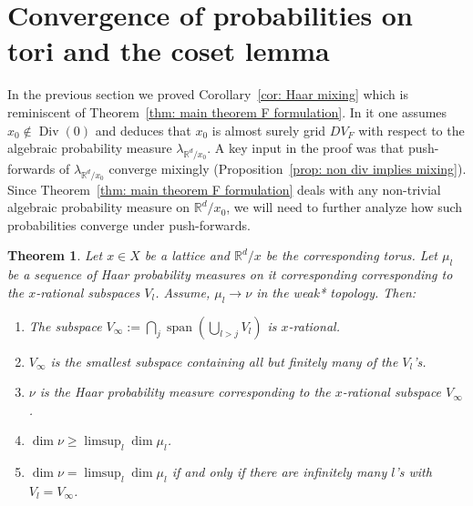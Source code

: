 \documentclass[reqno,11pt, twoside]{amsart}
\theoremstyle{plain}
\newtheorem{thm}{Theorem}[section]
\theoremstyle{definition}
\theoremstyle{definition}
\theoremstyle{remark}
\numberwithin{equation}{section}
\newcommand{\lam}{\lambda}
\newcommand{\bR}{\mathbb{R}}
\newcommand\pa[1]{\left(#1\right)}
\newcommand\on[1]{\operatorname{#1}}
\begin{document}
\section{Convergence of probabilities on tori and the coset lemma}\label{sec: coset}

In the previous section we proved Corollary~\ref{cor: Haar mixing} which is reminiscent of Theorem~\ref{thm: main theorem F formulation}. In it one assumes $x_0\notin \on{Div}(0)$ and deduces that $x_0$ is almost surely grid $DV_F$ with respect to the algebraic probability measure $\lam_{\bR^d/x_0}$. A key input in the proof was that push-forwards of 
$\lam_{\bR^d/x_0}$ converge mixingly (Proposition~\ref{prop: non div implies mixing}). 
Since Theorem~\ref{thm: main theorem F formulation} deals with any non-trivial algebraic probability measure on $\bR^d/x_0$, we will need to further analyze how such probabilities converge under push-forwards. 
\begin{thm}\label{thm: limits of subtori}
Let $x\in X$ be a lattice and $\bR^d/x$ be the corresponding torus. Let $\mu_l$ be a sequence of Haar probability measures on it corresponding
corresponding to the $x$-rational subspaces $V_l$. 
Assume, $\mu_l\to \nu$ in the weak* topology. Then:
\begin{enumerate} 
\item\label{i:los1} The subspace 
$V_\infty:= \bigcap_j\on{span}\pa{\bigcup_{l>j}V_l}$
is $x$-rational. 
\item\label{i:los2} $V_\infty$ is the smallest subspace containing all but finitely many of the $V_l$'s.
\item\label{i:los3} 
$\nu$ is the Haar probability measure corresponding to the $x$-rational subspace $V_\infty$.
\item\label{i:los4} $\dim \nu \ge\limsup_l\dim \mu_l$.
\item\label{i:los5} $\dim\nu  =\limsup_l\dim \mu_l$ if and only if there are infinitely many $l$'s with $V_l=V_\infty$.
\end{enumerate}
\end{thm}
\end{document}
